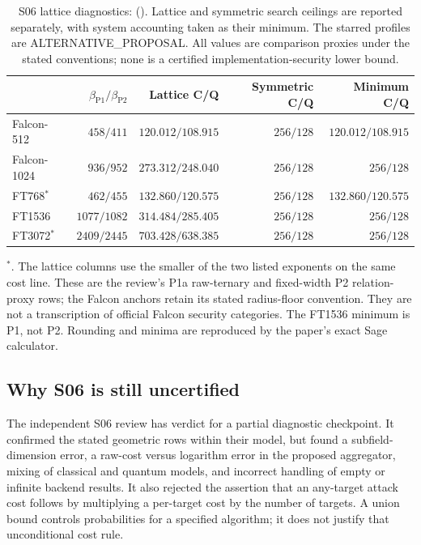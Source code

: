 \begin{table}[!htbp]
\centering\small
\begin{tabular}{lrrrr}
\toprule
 & $\beta_{\mathrm{P1}}/\beta_{\mathrm{P2}}$
 & Lattice C/Q & Symmetric C/Q & Minimum C/Q \\
\midrule
Falcon-512 & $458/411$ & $120.012/108.915$ & $256/128$ & $120.012/108.915$ \\
Falcon-1024 & $936/952$ & $273.312/248.040$ & $256/128$ & $256/128$ \\
FT768$^\ast$ & $462/455$ & $132.860/120.575$ & $256/128$ & $132.860/120.575$ \\
FT1536 & $1077/1082$ & $314.484/285.405$ & $256/128$ & $256/128$ \\
FT3072$^\ast$ & $2409/2445$ & $703.428/638.385$ & $256/128$ & $256/128$ \\
\bottomrule
\end{tabular}
\caption{S06 lattice diagnostics: \UNCERTIFIED{}
(). Lattice and symmetric search ceilings are
reported separately, with system accounting taken as their minimum.
The starred profiles are ALTERNATIVE\_PROPOSAL. All values are
comparison proxies under the stated conventions; none is a certified
implementation-security lower bound.}
\label{tab:security}
\end{table}
\noindent $^\ast$\ALTP. The lattice columns use the
smaller of the two listed exponents on the same cost line. These are
the review's P1a raw-ternary and fixed-width P2 relation-proxy rows;
the Falcon anchors retain its stated radius-floor convention. They
are not a transcription of official Falcon security categories.
The FT1536 minimum is P1, not P2. Rounding and minima are reproduced
by the paper's exact Sage calculator.

\subsection{Why S06 is still uncertified}
The independent S06 review has verdict  for
a partial diagnostic checkpoint. It confirmed the stated geometric
rows within their model, but found a subfield-dimension error, a
raw-cost versus logarithm error in the proposed aggregator, mixing of
classical and quantum models, and incorrect handling of empty or
infinite backend results. It also rejected the assertion that an
any-target attack cost follows by multiplying a per-target cost by
the number of targets. A union bound controls probabilities for a
specified algorithm; it does not justify that unconditional cost rule.

